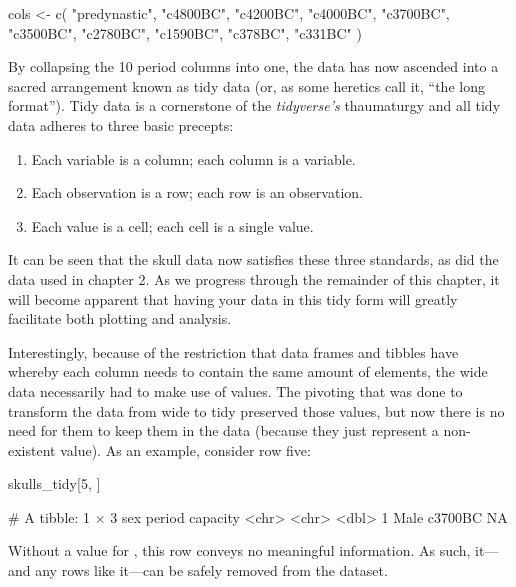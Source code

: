 \begin{inR}
cols <- c(
  "predynastic", "c4800BC", "c4200BC", "c4000BC", "c3700BC",
  "c3500BC", "c2780BC", "c1590BC", "c378BC", "c331BC"
)
\end{inR}
\vspace{1em}

By collapsing the 10 period columns into one, the data has now ascended into a sacred arrangement known as \gls{tidy data} (or, as some heretics call it, ``the long format'').  Tidy data is a cornerstone of the \textit{tidyverse's} thaumaturgy and all tidy data adheres to three basic precepts:

\begin{minipage}{\textwidth}

\begin{enumerate}[label=\Roman*.]
\IMFellEnglish
    \item Each variable is a column; each column is a variable.
    \item Each observation is a row; each row is an observation.
    \item Each value is a cell; each cell is a single value.
\end{enumerate}
\end{minipage}

\noindent
It can be seen that the skull data now satisfies these three standards, as did the  data used in chapter 2. As we progress through the remainder of this chapter, it will become apparent that having your data in this tidy form will greatly facilitate both plotting and analysis. 

Interestingly, because of the restriction that data frames and tibbles have whereby each column needs to contain the same amount of elements, the wide data necessarily had to make use of  values. The pivoting that was done to transform the data from wide to tidy preserved those  values, but now there is no need for them to keep them in the data (because they just represent a non-existent value). As an example, consider row five:

\clearpage

\begin{inR}
skulls_tidy[5, ]
\end{inR}
\begin{outR}
# A tibble: 1 × 3
  sex   period  capacity
  <chr> <chr>      <dbl>
1 Male  c3700BC       NA
\end{outR}

\noindent
Without a value for , this row conveys no meaningful information. As such, it—and any rows like it—can be safely removed from the dataset.

